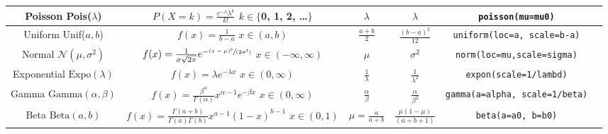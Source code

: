 \documentclass[10pt,landscape]{article}
\newcommand{\N}{\mathcal{N}}
\newcommand{\Beta}{\textrm{Beta}}
\newcommand{\Gam}{\textrm{Gamma}}
\newcommand{\Expo}{\textrm{Expo}}
\newcommand{\Pois}{\textrm{Pois}}
\newcommand{\Unif}{\textrm{Unif}}
\begin{document}
\begin{center}
\begin{tabular}{cccccc}
\shortstack{Poisson \\ \Pois($\lambda$)} & \shortstack{$P(X=k) = \frac{e^{-\lambda}\lambda^k}{k!}$ \\ $k \in \{$0, 1, 2, \dots $\}$} & $\lambda$ & $\lambda$ & \texttt{poisson(mu=mu0)} \\
\hline
\hline
\shortstack{Uniform \\ \Unif($a, b$)} & \shortstack{$ f(x) = \frac{1}{b-a}$ \\$ x \in (a, b) $} & $\frac{a+b}{2}$ & $\frac{(b-a)^2}{12}$ & \texttt{uniform(loc=a, scale=b-a)}\\
\hline
\shortstack{Normal \\ $\N(\mu, \sigma^2)$} & \shortstack{$f(x) = \frac{1}{\sigma \sqrt{2\pi}} e^{-\sfrac{(x - \mu)^2}{(2 \sigma^2)}}$ \\ $x \in (-\infty, \infty)$} & $\mu$  & $\sigma^2$ & \texttt{norm(loc=mu,scale=sigma)}\\
\hline
\shortstack{Exponential \\ $\Expo(\lambda)$} & \shortstack{$f(x) = \lambda e^{-\lambda x}$\\$ x \in (0, \infty)$} & $\frac{1}{\lambda}$  & $\frac{1}{\lambda^2}$ & \texttt{expon(scale=1/lambd)}\\
\hline
\shortstack{Gamma \\ $\Gam(\alpha, \beta)$} & \shortstack{$f(x) = \frac{\beta^\alpha}{\Gamma(\alpha)}x^{\alpha-1} e^{-\beta x}$\\$ x \in (0, \infty)$} & $\frac{\alpha}{\beta}$  & $\frac{\alpha}{\beta^2}$ & \texttt{gamma(a=alpha, scale=1/beta)}\\
\hline
\shortstack{Beta \\ $\Beta(a, b)$} & \shortstack{$f(x) = \frac{\Gamma(a+b)}{\Gamma(a)\Gamma(b)}x^{a-1}(1-x)^{b-1}$\\$x \in (0, 1) $} & $\mu = \frac{a}{a + b}$  & $\frac{\mu(1-\mu)}{(a + b + 1)}$  & \texttt{beta(a=a0, b=b0)}\\

\end{tabular}
\end{center}
\end{document}
